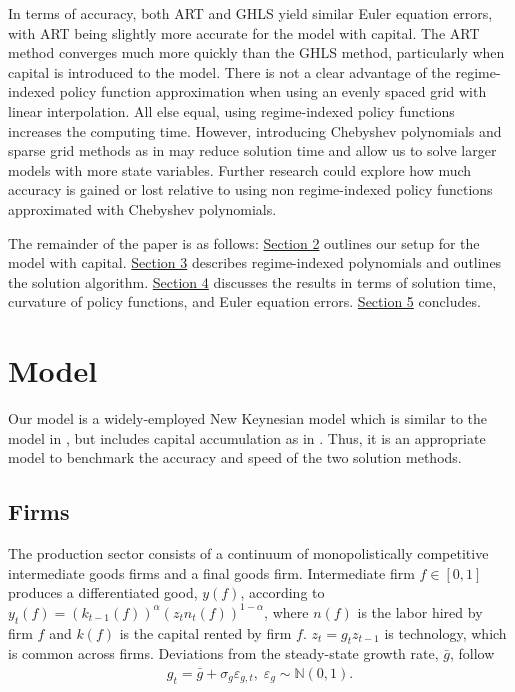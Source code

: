 \documentclass[12pt, final]{article}
\begin{document}
In terms of accuracy, both ART and GHLS yield similar Euler equation errors, with ART being slightly more accurate for the model with capital. The ART method converges much more quickly than the GHLS method, particularly when capital is introduced to the model. There is not a clear advantage of the regime-indexed policy function approximation when using an evenly spaced grid with linear interpolation. All else equal, using regime-indexed policy functions increases the computing time. However, introducing Chebyshev polynomials and sparse grid methods as in \hyperlink{Gust}{\color{black}{Gust et al.\ (2017)}} may reduce solution time and allow us to solve larger models with more state variables. Further research could explore how much accuracy is gained or lost relative to using non regime-indexed policy functions approximated with Chebyshev polynomials. 

The remainder of the paper is as follows: \hyperlink{Section 2}{Section 2} outlines our setup for the model with capital. \hyperlink{Section 3}{Section 3} describes regime-indexed polynomials and outlines the solution algorithm. \hyperlink{Section 4}{Section 4} discusses the results in terms of solution time, curvature of policy functions, and Euler equation errors. \hyperlink{Section 5}{Section 5} concludes.

\section[Section 2]{Model \hypertarget{Section 2}{}} 
Our model is a widely-employed New Keynesian model which is similar to the model in \hyperlink{Atkinson}{\color{black}{Atkinson et al.\ (2019)}}, but includes capital accumulation as in \hyperlink{Gust}{\color{black}{Gust et al.\ (2017)}}. Thus, it is an appropriate model to benchmark the accuracy and speed of the two solution methods.

\subsection{Firms} The production sector consists of a continuum of monopolistically competitive intermediate goods firms and a final goods firm. Intermediate firm $f \in [0,1]$ produces a differentiated good, $y(f)$, according to $y_t(f) = (k_{t-1}(f))^\alpha(z_tn_t(f))^{1-\alpha}$, where $n(f)$ is the labor hired by firm $f$ and $k(f)$ is the capital rented by firm $f$. $z_t = g_tz_{t-1}$ is technology, which is common across firms. Deviations from the steady-state growth rate, $\bar{g}$, follow
\begin{gather}
  \label{eq:1}
  g_t = \bar{g} + \sigma_g\varepsilon_{g,t},\; \varepsilon_g \sim \mathds{N}(0,1). 
\end{gather}
\end{document}
